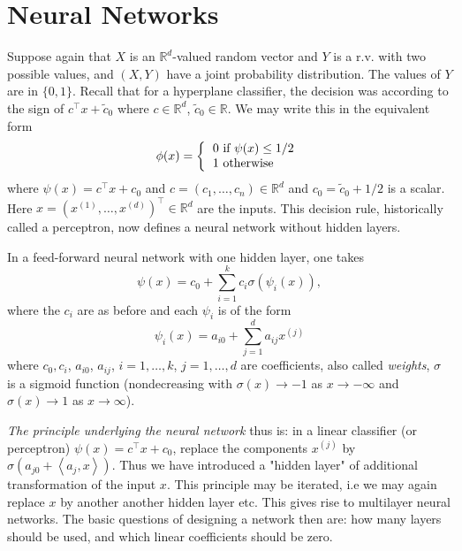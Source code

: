 \documentclass[11pt,twoside]{article}%
\theoremstyle{change}
\begin{document}
\newpage

\section{Neural Networks}

Suppose again that $X$ is an $\mathbb{R}^{d}$-valued random vector and $Y$ is
a r.v. with two possible values, and $\left(  X,Y\right)  $ have a joint
probability distribution. The values of $Y$ are in $\{0,1\}$. Recall that for
a hyperplane classifier, the decision was according to the sign of $c^{\top
}x+\tilde{c}_{0}$ where $c\in\mathbb{R}^{d}$, $\tilde{c}_{0}\in\mathbb{R}$. We
may write this in the equivalent form
\begin{equation}
\phi(x)=\left\{
\begin{tabular}
[c]{l}%
$0$ if $\psi(x)\leq1/2$\\
$1$ otherwise
\end{tabular}
\right. \label{nn-basic}%
\end{equation}
where $\psi(x)=c^{\top}x+c_{0}$ and $c=\left(  c_{1},\ldots,c_{n}\right)
\in\mathbb{R}^{d}$ and $c_{0}=\tilde{c}_{0}+1/2$ is a scalar. Here $x=\left(
x^{(1)},\ldots,x^{(d)}\right)  ^{\top}\in\mathbb{R}^{d}$ are the inputs. This
decision rule, historically called a perceptron, now defines a neural network
without hidden layers.

In a feed-forward neural network with one hidden layer, one takes
\begin{equation}
\psi(x)=c_{0}+\sum_{i=1}^{k}c_{i}\sigma\left(  \psi_{i}\left(  x\right)
\right)  ,\label{nn-one-hidden-layer}%
\end{equation}
where the $c_{i}$ are as before and each $\psi_{i}$ is of the form
\[
\psi_{i}\left(  x\right)  =a_{i0}+\sum_{j=1}^{d}a_{ij}x^{(j)}%
\]
where $c_{0},c_{i}$, $a_{i0}$, $a_{ij}$, $i=1,\ldots,k$, $j=1,\ldots,d$ are
coefficients, also called \textit{weights}, $\sigma$ is a sigmoid function
(nondecreasing with $\sigma(x)\rightarrow-1$ as $x\rightarrow-\infty$ and
$\sigma(x)\rightarrow1$ as $x\rightarrow\infty$).

\textit{The principle underlying the neural network} thus is: in a linear
classifier (or perceptron) $\psi(x)=c^{\top}x+c_{0}$, replace the components
$x^{(j)}$ by $\sigma\left(  a_{j0}+\left\langle a_{j},x\right\rangle \right)
$. Thus we have introduced a "hidden layer" of additional transformation of
the input $x$. This principle may be iterated, i.e we may again replace $x$ by
another another hidden layer etc. This gives rise to multilayer neural
networks. The basic questions of designing a network then are: how many layers
should be used, and which linear coefficients should be zero.
\end{document}
